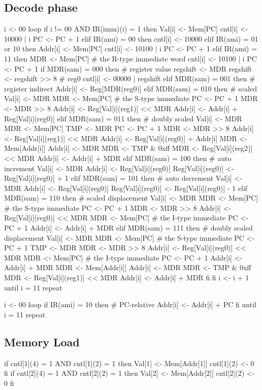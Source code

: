 \documentclass[12pt]{article}
\begin{document}
\subsection{Decode phase}
\begin{verbatimtab}
i <- 00
loop
	if i != 00 AND IR(imm)(i) = 1 then
		Val[i] <- Mem[PC]
		cntl[i] <- 10000 | i
		PC <- PC + 1
	elif IR(ami) = 00 then
		cntl[i] <- 10000
	elif IR(ami) = 01 or 10 then
		Addr[i] <- Mem[PC]
		cntl[i] <- 10100 | i
		PC <- PC + 1
	elif IR(ami) = 11 then
		MDR <- Mem[PC] # the R-type immediate word
		cntl[i] <- 10100 | i
		PC <- PC + 1
		if MDR(sam) = 000 then # register value
			regshift <- MDR
			regshift <- regshift >> 8 # reg0
			cntl[i] <- 00000 | regshift
		elif MDR(sam) = 001 then # register indirect
			Addr[i] <- Reg[MDR(reg0)]
		elif MDR(sam) = 010 then # scaled
			Val[i] <- MDR
			MDR <- Mem[PC] # the S-type immediate
			PC <- PC + 1
			MDR <- MDR >> 8
			Addr[i] <- Reg[Val[i](reg1)] << MDR
			Addr[i] <- Addr[i] + Reg[Val[i](reg0)]
		elif MDR(sam) = 011 then # doubly scaled
			Val[i] <- MDR
			MDR <- Mem[PC]
			TMP <- MDR
			PC <- PC + 1
			MDR <- MDR >> 8
			Addr[i] <- Reg[Val[i](reg1)] << MDR
			Addr[i] <- Reg[Val[i](reg0)] + Addr[i]
			MDR <- Mem[Addr[i]]
			Addr[i] <- MDR
			MDR <- TMP & 0xff
			MDR <- Reg[Val[i](reg2)] << MDR
			Addr[i] <- Addr[i] + MDR
		elif MDR(sam) = 100 then # auto increment
			Val[i] <- MDR
			Addr[i] <- Reg[Val[i](reg0)]
			Reg[Val[i](reg0)] <- Reg[Val[i](reg0)] + 1
		elif MDR(sam) = 101 then # auto decrement
			Val[i] <- MDR
			Addr[i] <- Reg[Val[i](reg0)]
			Reg[Val[i](reg0)] <- Reg[Val[i](reg0)] - 1
		elif MDR(sam) = 110 then # scaled displacement
			Val[i] <- MDR
			MDR <- Mem[PC] # the S-type immediate
			PC <- PC + 1
			MDR <- MDR >> 8
			Addr[i] <- Reg[Val[i](reg0)] << MDR
			MDR <- Mem[PC] # the I-type immediate
			PC <- PC + 1
			Addr[i] <- Addr[i] + MDR
		elif MDR(sam) = 111 then # doubly scaled displacement
			Val[i] <- MDR
			MDR <- Mem[PC] # the S-type immediate
			PC <- PC + 1
			TMP <- MDR
			MDR <- MDR >> 8
			Addr[i] <- Reg[Val[i](reg0)] << MDR
			MDR <- Mem[PC] # the I-type immediate
			PC <- PC + 1
			Addr[i] <- Addr[i] + MDR
			MDR <- Mem[Addr[i]]
			Addr[i] <- MDR
			MDR <- TMP & 0xff
			MDR <- Reg[Val[i](reg1)] << MDR
			Addr[i] <- Addr[i] + MDR
		fi
	fi
	i <- i + 1
until i = 11 repeat

i <- 00
loop
	if IR(ami) = 10 then # PC-relative
		Addr[i] <- Addr[i] + PC
	fi
until i = 11 repeat
\end{verbatimtab}

\subsection{Memory Load}
\begin{verbatimtab}
if cntl[1](4) = 1 AND cntl[1](2) = 1 then
	Val[1] <- Mem[Addr[1]]
	cntl[1](2) <- 0
fi
if cntl[2](4) = 1 AND cntl[2](2) = 1 then
	Val[2] <- Mem[Addr[2]]
	cntl[2](2) <- 0
fi
\end{verbatimtab}
\end{document}
